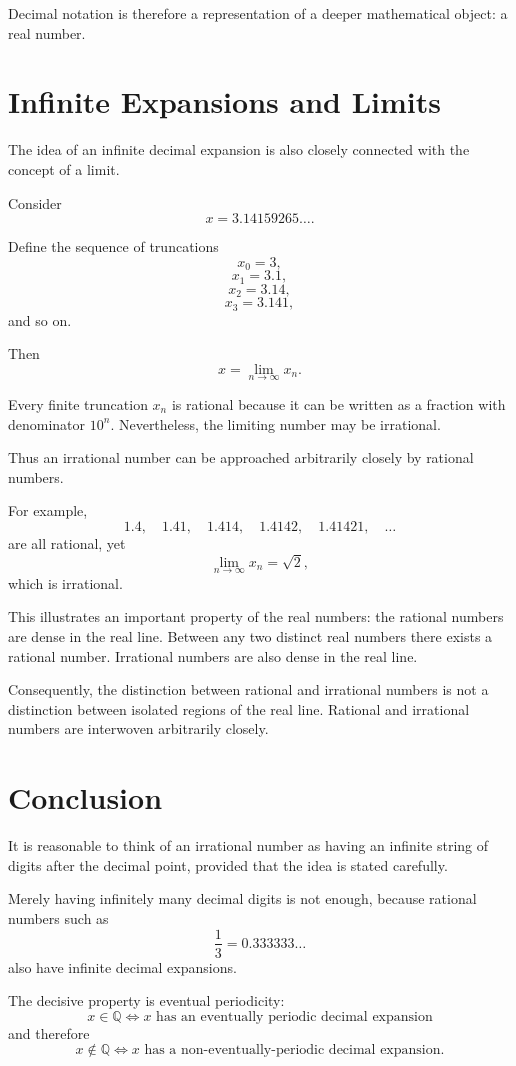 \documentclass{essay}
\begin{document}
Decimal notation is therefore a representation of a deeper mathematical object: a real number.

\section{Infinite Expansions and Limits}

The idea of an infinite decimal expansion is also closely connected with the concept of a limit.

Consider
\[ x=3.14159265\ldots. \]

Define the sequence of truncations
\[ x_{0}=3, \]
\[ x_{1}=3.1, \]
\[ x_{2}=3.14, \]
\[ x_{3}=3.141, \]
and so on.

Then
\[ x=\lim_{n\to\infty}x_{n}. \]

Every finite truncation \(x_{n}\) is rational because it can be written as a fraction with denominator \(10^{n}\). Nevertheless, the limiting number may be irrational.

Thus an irrational number can be approached arbitrarily closely by rational numbers.

For example,
\[ 1.4,\quad 1.41,\quad 1.414,\quad 1.4142,\quad 1.41421,\quad\ldots \]
are all rational, yet
\[ \lim_{n\to\infty}x_{n}=\sqrt{2}, \]
which is irrational.

This illustrates an important property of the real numbers: the rational numbers are dense in the real line. Between any two distinct real numbers there exists a rational number. Irrational numbers are also dense in the real line.

Consequently, the distinction between rational and irrational numbers is not a distinction between isolated regions of the real line. Rational and irrational numbers are interwoven arbitrarily closely.

\section{Conclusion}

It is reasonable to think of an irrational number as having an infinite string of digits after the decimal point, provided that the idea is stated carefully.

Merely having infinitely many decimal digits is not enough, because rational numbers such as
\[ \frac{1}{3}=0.333333\ldots \]
also have infinite decimal expansions.

The decisive property is eventual periodicity:
\[
  \boxed{
    x\in\mathbb{Q}
    \iff
    \text{\(x\) has an eventually periodic decimal expansion}
  }
\]
and therefore
\[
  \boxed{
    x\notin\mathbb{Q}
    \iff
    \text{\(x\) has a non-eventually-periodic decimal expansion}.
  }
\]
\end{document}
